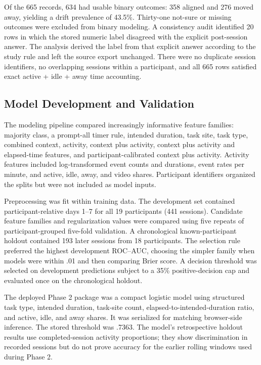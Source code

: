 \documentclass[12pt,a4paper]{article}
\begin{document}
Of the 665 records, 634 had usable binary outcomes: 358 aligned and 276 moved away, yielding a drift prevalence of 43.5\%. Thirty-one not-sure or missing outcomes were excluded from binary modeling. A consistency audit identified 20 rows in which the stored numeric label disagreed with the explicit post-session answer. The analysis derived the label from that explicit answer according to the study rule and left the source export unchanged. There were no duplicate session identifiers, no overlapping sessions within a participant, and all 665 rows satisfied exact active + idle + away time accounting.

\subsection{Model Development and Validation}

The modeling pipeline compared increasingly informative feature families: majority class, a prompt-all timer rule, intended duration, task site, task type, combined context, activity, context plus activity, context plus activity and elapsed-time features, and participant-calibrated context plus activity. Activity features included log-transformed event counts and durations, event rates per minute, and active, idle, away, and video shares. Participant identifiers organized the splits but were not included as model inputs.

Preprocessing was fit within training data. The development set contained participant-relative days 1--7 for all 19 participants (441 sessions). Candidate feature families and regularization values were compared using five repeats of participant-grouped five-fold validation. A chronological known-participant holdout contained 193 later sessions from 18 participants. The selection rule preferred the highest development ROC--AUC, choosing the simpler family when models were within .01 and then comparing Brier score. A decision threshold was selected on development predictions subject to a 35\% positive-decision cap and evaluated once on the chronological holdout.

The deployed Phase 2 package was a compact logistic model using structured task type, intended duration, task-site count, elapsed-to-intended-duration ratio, and active, idle, and away shares. It was serialized for matching browser-side inference. The stored threshold was .7363. The model's retrospective holdout results use completed-session activity proportions; they show discrimination in recorded sessions but do not prove accuracy for the earlier rolling windows used during Phase 2.
\end{document}
